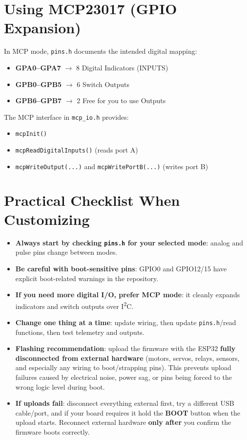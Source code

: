 \section{Using MCP23017 (GPIO Expansion)}

In MCP mode, \texttt{pins.h} documents the intended digital mapping:
\begin{itemize}
    \item \textbf{GPA0--GPA7} $\rightarrow$ 8 Digital Indicators (INPUTS)
    \item \textbf{GPB0--GPB5} $\rightarrow$ 6 Switch Outputs
    \item \textbf{GPB6--GPB7} $\rightarrow$ 2 Free for you to use Outputs
\end{itemize}

The MCP interface in \texttt{mcp\_io.h} provides:
\begin{itemize}
    \item \verb|mcpInit()|
    \item \verb|mcpReadDigitalInputs()| (reads port A)
    \item \verb|mcpWriteOutput(...)| and \verb|mcpWritePortB(...)| (writes port B)
\end{itemize}

\section{Practical Checklist When Customizing}

\begin{itemize}
    \item \textbf{Always start by checking \texttt{pins.h} for your selected mode}: analog and pulse pins change between modes.
    \item \textbf{Be careful with boot-sensitive pins}: GPIO0 and GPIO12/15 have explicit boot-related warnings in the repository.
    \item \textbf{If you need more digital I/O, prefer MCP mode}: it cleanly expands indicators and switch outputs over I\textsuperscript{2}C.
    \item \textbf{Change one thing at a time}: update wiring, then update \texttt{pins.h}/read functions, then test telemetry and outputs.
    \item \textbf{Flashing recommendation}: upload the firmware with the ESP32 \textbf{fully disconnected from external hardware} (motors, servos, relays, sensors, and especially any wiring to boot/strapping pins). This prevents upload failures caused by electrical noise, power sag, or pins being forced to the wrong logic level during boot.
    \item \textbf{If uploads fail}: disconnect everything external first, try a different USB cable/port, and if your board requires it hold the \textbf{BOOT} button when the upload starts. Reconnect external hardware \textbf{only after} you confirm the firmware boots correctly.
\end{itemize}